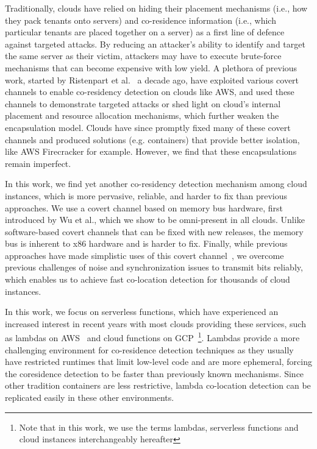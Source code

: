 Traditionally, clouds have relied on hiding their placement mechanisms (i.e.,
how they pack tenants onto servers) and co-residence information (i.e., which
particular tenants are placed together on a server) as a first line of defence
against targeted attacks. By reducing an attacker's ability to identify and
target the same server as their victim, attackers may have to execute
brute-force mechanisms that can become expensive with low yield.  A plethora of
previous work, started by Ristenpart et al.~\cite{ristenpartccs2009} a decade
ago, have exploited various covert channels to enable co-residency detection on
clouds like AWS, and used these channels to demonstrate targeted attacks or
shed light on cloud's internal placement and resource allocation
mechanisms, which further weaken the encapsulation model. Clouds
have since promptly fixed many of these covert channels and produced solutions
(e.g. containers) that provide better isolation, like AWS
Firecracker\cite{firecracker} for example. However, we find that these
encapsulations remain imperfect.


In this work, we find yet another co-residency detection mechanism among cloud
instances, which is more pervasive, reliable, and harder to fix than previous
approaches. We use a covert channel based on memory bus hardware, first
introduced by Wu et al.\cite{wuusenix2012}, which we show to be omni-present in
all clouds. Unlike software-based covert channels that can be fixed with new
releases, the memory bus is inherent to x86 hardware and is harder to fix.
Finally, while previous approaches have made simplistic uses of this covert
channel~\cite{varadarajan2015}, we overcome previous challenges of noise and
synchronization issues to transmit bits reliably, which enables us to achieve
fast co-location detection for thousands of cloud instances.


In this work, we focus on serverless functions, which have experienced an
increased interest in recent years with most clouds providing these services,
such as lambdas on AWS~\cite{awslambda} and cloud functions on
GCP~\cite{gcpfunctions}\footnote{Note that in this work, we use the terms
lambdas, serverless functions and cloud instances interchangeably hereafter}.
Lambdas provide a more challenging environment for co-residence detection
techniques as they usually have restricted runtimes that limit low-level code
and are more ephemeral, forcing the coresidence detection to be faster than
previously known mechanisms. Since other
tradition containers are less restrictive, lambda co-location detection can be
replicated easily in these other environments.


